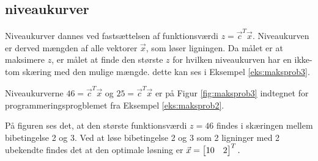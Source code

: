 \subsection{niveaukurver}
Niveaukurver dannes ved fastsættelsen af funktionsværdi $z=\vec{c}^T \vec{x}$. Niveaukurven er derved mængden af alle vektorer $\vec{x}$, som løser ligningen. Da målet er at maksimere $z$, er målet at finde den største $z$ for hvilken niveaukurven har en ikke-tom skæring med den mulige mængde. dette kan ses i Eksempel \ref{eks:maksprob3}.
\begin{comment}
Bør niveaukurve defineres????? Hvordan kan dette bruges, for at finde $z$ er egentlig bare en omskrivning, så der mangler noget argumentation for at $z$ bliver større jo længere væk fra origo man er, hvilket giver ret god mening, men er svært at argumentere for uden at starte på geometri, så måske hele dette afsnit skulle flyttes, måske skal alt om løsninger skal flyttes til geometri?
\end{comment}


\begin{eks}
Niveaukurverne $46=\vec{c}^T \vec{x}$ og $25=\vec{c}^T \vec{x}$ er på Figur \ref{fig:maksprob3} indtegnet for programmeringsprogblemet fra Eksempel \ref{eks:maksprob2}.

	\begin{center}	
		
		\label{fig:maksprob3}
	\end{center}
	
På figuren ses det, at den største funktionsværdi $z=46$ findes i skæringen mellem bibetingelse 2 og 3.
Ved at løse bibetingelse 2 og 3 som 2 ligninger med 2 ubekendte findes det at den optimale løsning er $\vec{x}=\begin{bmatrix} 10 & 2 \end{bmatrix}^T.$
\label{eks:maksprob3}
\end{eks}

\begin{comment}
Ved ikke om det giver mening under niveaukurver, at beskrive:
At da f er lineær, medfører det at den har en monoton udvikling når variablene har en monoton udvikling, så derfor hvis kurven rykkes ud fra en retnings vektor der står vinkelret på kurven, brude $Z$ være voksende eller aftagende. Og så gælder det om at finde den længst mulige vinkelrette afstand fra niveau kurven og origo, før at nivuae kurven ikke skære med den muligeløsningsmængde længere. Men ved ikke om det kan gøres strengent nok, synes bare som det er at niveau kurve afsnittet flagre lidt.
\end{comment}


